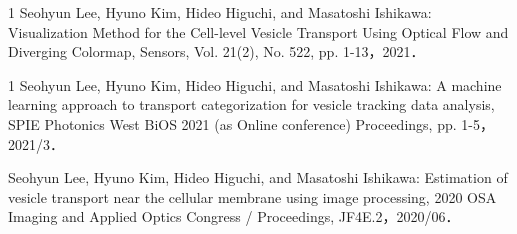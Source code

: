 \begin{雑誌論文}{1}
Seohyun Lee, Hyuno Kim, Hideo Higuchi, and Masatoshi Ishikawa: Visualization Method for the Cell-level Vesicle Transport Using Optical Flow and Diverging Colormap, Sensors, Vol. 21(2), No. 522, pp. 1-13，2021．

\end{雑誌論文}

\begin{査読付}{1}
Seohyun Lee, Hyuno Kim, Hideo Higuchi, and Masatoshi Ishikawa: A machine learning approach to transport categorization for vesicle tracking data analysis, SPIE Photonics West BiOS 2021 (as Online conference) Proceedings, pp. 1-5，2021/3．

Seohyun Lee, Hyuno Kim, Hideo Higuchi, and Masatoshi Ishikawa: Estimation of vesicle transport near the cellular membrane using image processing, 2020 OSA Imaging and Applied Optics Congress / Proceedings, JF4E.2，2020/06．

\end{査読付}
